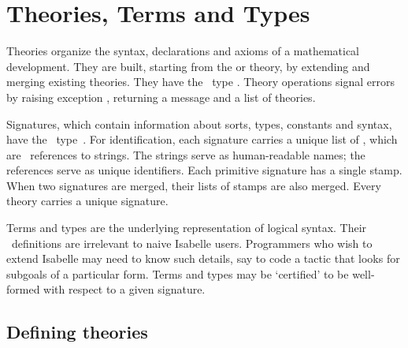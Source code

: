 
\chapter{Theories, Terms and Types} \label{theories}
 Theories organize the
syntax, declarations and axioms of a mathematical development.  They
are built, starting from the {\Pure} or {\CPure} theory, by extending
and merging existing theories.  They have the \ML\ type
.  Theory operations signal errors by raising exception
, returning a message and a list of theories.

Signatures, which contain information about sorts, types, constants and
syntax, have the \ML\ type~.  For identification, each
signature carries a unique list of , which are \ML\
references to strings.  The strings serve as human-readable names; the
references serve as unique identifiers.  Each primitive signature has a
single stamp.  When two signatures are merged, their lists of stamps are
also merged.  Every theory carries a unique signature.

Terms and types are the underlying representation of logical syntax.  Their
\ML\ definitions are irrelevant to naive Isabelle users.  Programmers who
wish to extend Isabelle may need to know such details, say to code a tactic
that looks for subgoals of a particular form.  Terms and types may be
`certified' to be well-formed with respect to a given signature.


\section{Defining theories}\label{sec:ref-defining-theories}

